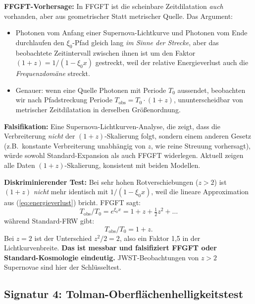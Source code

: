 \textbf{FFGFT-Vorhersage:} In FFGFT ist die scheinbare Zeitdilatation
\emph{auch} vorhanden, aber aus geometrischer Statt metrischer Quelle.
Das Argument:

\begin{itemize}[leftmargin=2em,itemsep=2pt,topsep=2pt]
  \item Photonen vom Anfang einer Supernova-Lichtkurve und Photonen
        vom Ende durchlaufen den $\xi_0$-Pfad gleich lang
        \emph{im Sinne der Strecke}, aber das beobachtete Zeitintervall
        zwischen ihnen ist um den Faktor $(1+z) = 1/(1 - \xi_0 x)$
        gestreckt, weil der relative Energieverlust auch die
        \emph{Frequenzdomäne} streckt.
  \item Genauer: wenn eine Quelle Photonen mit Periode $T_0$ aussendet,
        beobachten wir nach Pfadstreckung Periode
        $T_{\text{obs}} = T_0 \cdot (1+z)$, ununterscheidbar von
        metrischer Zeitdilatation in derselben Größenordnung.
\end{itemize}

\textbf{Falsifikation:} Eine Supernova-Lichtkurven-Analyse, die zeigt,
dass die Verbreiterung \emph{nicht} der $(1+z)$-Skalierung folgt,
sondern einem anderen Gesetz (z.B.\ konstante Verbreiterung
unabhängig von $z$, wie reine Streuung vorhersagt), würde sowohl
Standard-Expansion als auch FFGFT widerlegen. Aktuell zeigen alle
Daten $(1+z)$-Skalierung, konsistent mit beiden Modellen.

\textbf{Diskriminierender Test:} Bei sehr hohen Rotverschiebungen
($z > 2$) ist $(1+z)$ \emph{nicht} mehr identisch mit
$1/(1 - \xi_0 x)$, weil die lineare Approximation aus
(\ref{eq:energieverlust}) bricht. FFGFT sagt:
\begin{equation}
  T_{\text{obs}}/T_0 = e^{\xi_0 x} = 1 + z + \tfrac{1}{2}z^2 + \ldots
\end{equation}
während Standard-FRW gibt:
\begin{equation}
  T_{\text{obs}}/T_0 = 1 + z.
\end{equation}
Bei $z = 2$ ist der Unterschied $z^2/2 = 2$, also ein Faktor 1{,}5 in
der Lichtkurvenbreite. \textbf{Das ist messbar und falsifiziert FFGFT
oder Standard-Kosmologie eindeutig.} JWST-Beobachtungen von $z > 2$
Supernovae sind hier der Schlüsseltest.

\subsection{Signatur 4: Tolman-Oberflächenhelligkeitstest}

